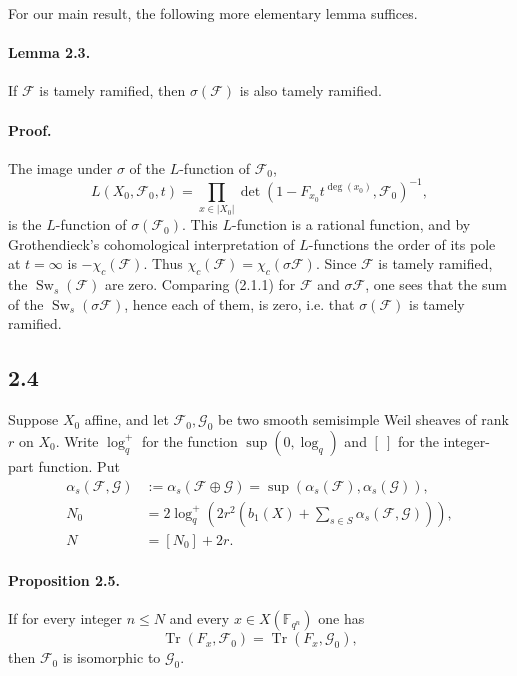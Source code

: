 \documentclass[10pt]{article}
\newcommand{\F}{\mathbb{F}}
\newcommand{\Tr}{\operatorname{Tr}}
\newcommand{\Sw}{\operatorname{Sw}}
\begin{document}
For our main result, the following more elementary lemma suffices.

\paragraph{Lemma 2.3.}
If $\mathcal F$ is tamely ramified, then $\sigma(\mathcal F)$ is also tamely ramified.

\paragraph{Proof.}
The image under $\sigma$ of the $L$-function of $\mathcal F_0$,
\[
 L(X_0,\mathcal F_0,t)=\prod_{x\in |X_0|}\det\left(1-F_{x_0}t^{\deg(x_0)},\mathcal F_0\right)^{-1},
\]
is the $L$-function of $\sigma(\mathcal F_0)$.
This $L$-function is a rational function, and by Grothendieck's cohomological interpretation of $L$-functions the order of its pole at $t=\infty$ is $-\chi_c(\mathcal F)$.
Thus $\chi_c(\mathcal F)=\chi_c(\sigma\mathcal F)$.
Since $\mathcal F$ is tamely ramified, the $\Sw_s(\mathcal F)$ are zero.
Comparing (2.1.1) for $\mathcal F$ and $\sigma\mathcal F$, one sees that the sum of the $\Sw_s(\sigma\mathcal F)$, hence each of them, is zero, i.e. that $\sigma(\mathcal F)$ is tamely ramified.

\subsection*{2.4}
Suppose $X_0$ affine, and let $\mathcal F_0,\mathcal G_0$ be two smooth semisimple Weil sheaves of rank $r$ on $X_0$.
Write $\log_q^+$ for the function $\sup(0,\log_q)$ and $[\ ]$ for the integer-part function.
Put
\begin{align}
 \alpha_s(\mathcal F,\mathcal G)&:=\alpha_s(\mathcal F\oplus\mathcal G)=\sup(\alpha_s(\mathcal F),\alpha_s(\mathcal G)),\tag{2.4.1}\\
 N_0&=2\log_q^+\left(2r^2\left(b_1(X)+\sum_{s\in S}\alpha_s(\mathcal F,\mathcal G)\right)\right),\tag{2.4.2}\\
 N&=[N_0]+2r.\tag{2.4.3}
\end{align}

\paragraph{Proposition 2.5.}
If for every integer $n\le N$ and every $x\in X(\F_{q^n})$ one has
\[
 \Tr(F_x,\mathcal F_0)=\Tr(F_x,\mathcal G_0),
\]
then $\mathcal F_0$ is isomorphic to $\mathcal G_0$.
\end{document}
